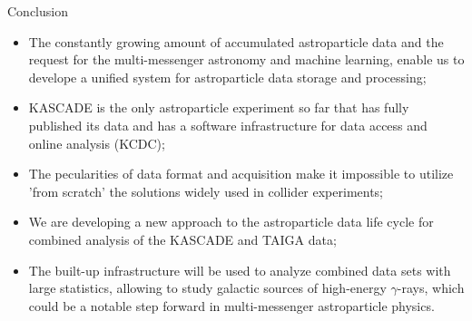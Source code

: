 \begin{frame}{Conclusion}
\small
\begin{itemize}
  \item The constantly growing amount of accumulated astroparticle data and the request for the multi-messenger astronomy and machine learning, enable us to develope a unified system for astroparticle data storage and processing;
  \item KASCADE is the only astroparticle experiment so far that has fully published its data and has a software infrastructure for data access and online analysis (KCDC);
  \item The pecularities of data format and acquisition make it impossible to utilize 'from scratch' the solutions widely used in collider experiments;
  \item We are developing a new approach to the astroparticle data life cycle for combined analysis of the KASCADE and TAIGA data;
  \item The built-up infrastructure will be used to analyze combined data sets with large statistics, allowing to study galactic sources of high-energy $\gamma$-rays, 
  which could be a notable step forward in multi-messenger astroparticle physics.

\end{itemize}
\end{frame}

%
